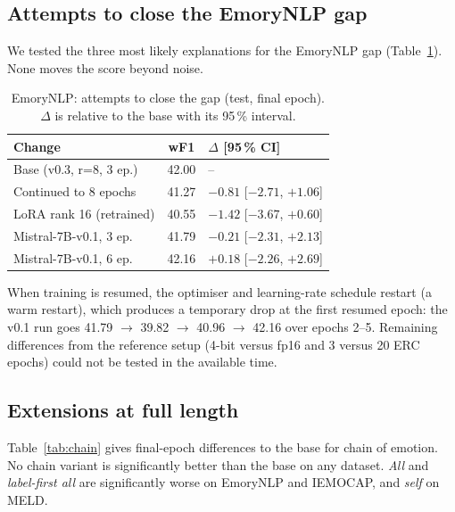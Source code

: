 \documentclass[lettersize,journal]{IEEEtran}
\begin{document}
\subsection{Attempts to close the EmoryNLP gap}
We tested the three most likely explanations for the EmoryNLP gap (Table~\ref{tab:gap}). None moves the score beyond noise.

\begin{table}[!t]
\caption{EmoryNLP: attempts to close the gap (test, final epoch). $\Delta$ is relative to the base with its 95\,\% interval.}\label{tab:gap}
\centering\small
\begin{tabular}{lcl}
\toprule
Change & wF1 & $\Delta$ [95\,\% CI]\\
\midrule
Base (v0.3, r=8, 3 ep.) & 42.00 & --\\
Continued to 8 epochs & 41.27 & $-0.81$ [$-2.71$, $+1.06$]\\
LoRA rank 16 (retrained) & 40.55 & $-1.42$ [$-3.67$, $+0.60$]\\
Mistral-7B-v0.1, 3 ep. & 41.79 & $-0.21$ [$-2.31$, $+2.13$]\\
Mistral-7B-v0.1, 6 ep. & 42.16 & $+0.18$ [$-2.26$, $+2.69$]\\
\bottomrule
\end{tabular}
\end{table}

When training is resumed, the optimiser and learning-rate schedule restart (a warm restart), which produces a temporary drop at the first resumed epoch: the v0.1 run goes 41.79 $\to$ 39.82 $\to$ 40.96 $\to$ 42.16 over epochs 2--5. Remaining differences from the reference setup (4-bit versus fp16 and 3 versus 20 ERC epochs) could not be tested in the available time.

\subsection{Extensions at full length}
Table~\ref{tab:chain} gives final-epoch differences to the base for chain of emotion. No chain variant is significantly better than the base on any dataset. \emph{All} and \emph{label-first all} are significantly worse on EmoryNLP and IEMOCAP, and \emph{self} on MELD.
\end{document}
